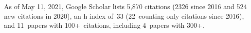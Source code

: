 %
As of May 11, 2021, Google Scholar lists
5,870 citations (2326 since 2016 and 524 new citations in 2020),
an h-index of~33 (22~counting only citations since 2016),
and 11~papers with 100+~citations, including 4~papers with 300+.
